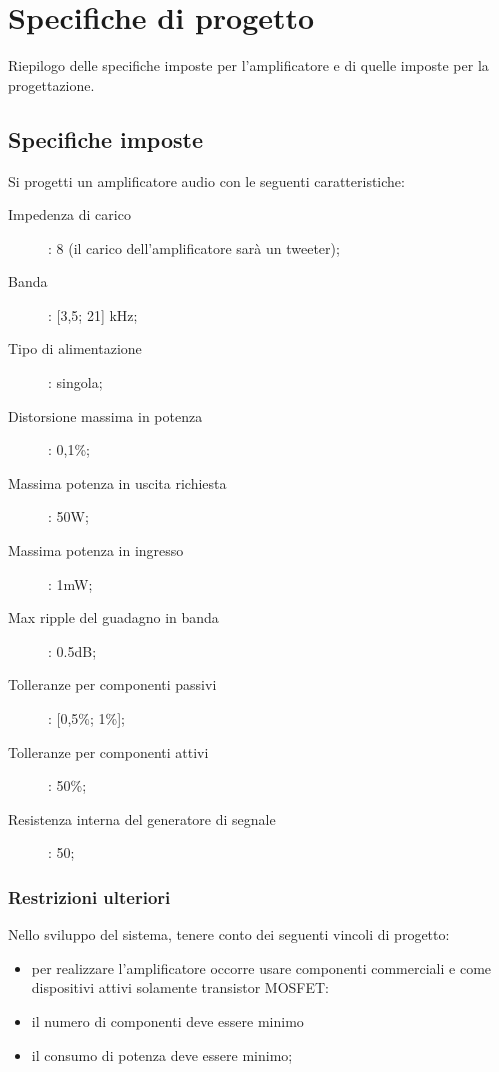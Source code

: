 %
\chapter{Specifiche di progetto}
\vspace {30pt}

Riepilogo delle specifiche imposte per l'amplificatore e di quelle imposte per
la progettazione.
\newpage

\section{Specifiche imposte}
  Si progetti un amplificatore audio con le seguenti caratteristiche:
  \begin{description}
    \item[Impedenza di carico]: 8 \ohm (il carico dell'amplificatore sar\`a un
      tweeter);
    \item[Banda]: [3,5; 21] kHz;
    \item[Tipo di alimentazione]: singola;
    \item[Distorsione massima in potenza]: 0,1\%;
    \item[Massima potenza in uscita richiesta]: 50W;
    \item[Massima potenza in ingresso]: 1mW;
    \item[Max ripple del guadagno in banda]: 0.5dB;
    \item[Tolleranze per componenti passivi]: [0,5\%; 1\%];
    \item[Tolleranze per componenti attivi]: 50\%;
    \item[Resistenza interna del generatore di segnale]: 50\ohm;
  \end{description}
  \subsection{Restrizioni ulteriori}
  Nello sviluppo del sistema, tenere conto dei seguenti vincoli di progetto:
  \begin{itemize}
    \item per realizzare l'amplificatore occorre usare componenti commerciali e
      come dispositivi attivi solamente transistor MOSFET:
    \item il numero di componenti deve essere minimo
    \item il consumo di potenza deve essere minimo;
  \end{itemize}
